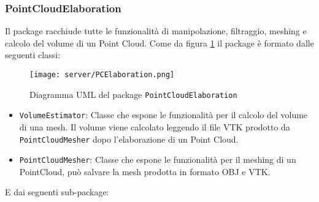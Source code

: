 \subsubsection{PointCloudElaboration}
Il package racchiude tutte le funzionalità di manipolazione, filtraggio, meshing e calcolo del volume di un Point Cloud. 
Come da figura \ref{fig:PCElaboration} il package è formato dalle seguenti classi:
\begin{figure}[!h] 
    \centering 
    \texttt{[image: server/PCElaboration.png]} 
    \caption{Diagramma UML del package \texttt{PointCloudElaboration}}
   \label{fig:PCElaboration}
\end{figure}
\begin{itemize}
\item\texttt{VolumeEstimator}: Classe che espone le funzionalità per il calcolo del volume di una mesh. Il volume viene calcolato leggendo il file VTK prodotto da \texttt{PointCloudMesher} dopo l'elaborazione di un Point Cloud.
\item\texttt{PointCloudMesher}: Classe che espone le funzionalità per il meshing di un PointCloud, può salvare la mesh prodotta in formato OBJ e VTK.
\end{itemize}
E dai seguenti sub-package:
